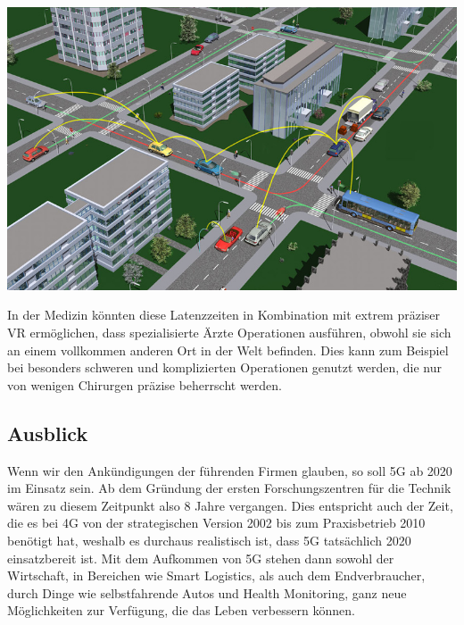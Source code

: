 \begin{multicols}{3}
\begin{Figure}
\includegraphics[width=\linewidth]{Kapitel/5G/Grafiken/c2c}
\label{fig:5g.c2c}
\end{Figure}

In der Medizin könnten diese Latenzzeiten in Kombination mit extrem präziser VR ermöglichen, dass spezialisierte Ärzte Operationen ausführen, obwohl sie sich an einem vollkommen anderen Ort in der Welt befinden. Dies kann zum Beispiel bei besonders schweren und komplizierten Operationen genutzt werden, die nur von wenigen Chirurgen präzise beherrscht werden.\cite{5g.10}
\subsection*{Ausblick}
Wenn wir den Ankündigungen der führenden Firmen glauben, so soll 5G ab 2020 im Einsatz sein. Ab dem Gründung der ersten Forschungszentren für die Technik wären zu diesem Zeitpunkt also 8 Jahre vergangen.
Dies entspricht auch der Zeit, die es bei 4G von der strategischen Version 2002 bis zum Praxisbetrieb 2010 benötigt hat, weshalb es durchaus realistisch ist, dass 5G tatsächlich 2020 einsatzbereit ist. 
Mit dem Aufkommen von 5G stehen dann sowohl der Wirtschaft, in Bereichen wie Smart Logistics, als auch dem Endverbraucher, durch Dinge wie selbstfahrende Autos und Health Monitoring, ganz neue Möglichkeiten zur Verfügung, die das Leben verbessern können.

\printbibliography[segment=10,heading=subbibliography]
\end{multicols}

\newpage
